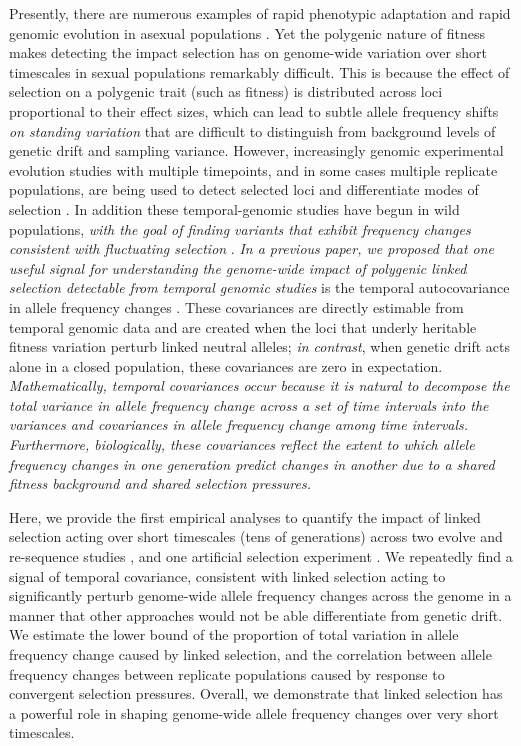 \documentclass[11pt]{article}
\newcommand{\vb}[1]{{\it \color{blue} #1}}
\begin{document}
Presently, there are numerous examples of rapid phenotypic adaptation
\parencite{Grant2011-wk,Grant2006-hj,Reznick1997-mh,Franks2007-dr} and rapid
genomic evolution in asexual populations
\parencite{Good2017-om,Bennett1990-bc,Baym2016-kh}.  Yet the polygenic nature
of fitness makes detecting the impact selection has on genome-wide variation
over short timescales in sexual populations remarkably difficult. This is
because the effect of selection on a polygenic trait (such as fitness) is
distributed across loci proportional to their effect sizes, which can lead to
subtle allele frequency shifts \vb{on standing variation} that are difficult to
distinguish from background levels of genetic drift and sampling variance.
However, increasingly genomic experimental evolution studies with multiple
timepoints, and in some cases multiple replicate populations, are being used to
detect selected loci \parencite{Turner2011-sx,Turner2012-bm} and differentiate
modes of selection \parencite{Burke2010-tz,Barghi2019-qy,Therkildsen2019-zy}.
In addition these temporal-genomic studies have begun in wild populations,
\vb{with the goal of finding variants that exhibit frequency changes consistent
with fluctuating selection} \parencite{Bergland2014-ij,Machado2018-cs}. \vb{In
a previous paper, we proposed that one useful signal for understanding the
genome-wide impact of polygenic linked selection detectable from temporal
genomic studies} is the temporal autocovariance in allele frequency changes
\parencite{Buffalo2019-io}.  These covariances are directly estimable from
temporal genomic data and are created when the loci that underly heritable
fitness variation perturb linked neutral alleles; \vb{in contrast}, when
genetic drift acts alone in a closed population, these covariances are zero in
expectation. \vb{Mathematically, temporal covariances occur because it is
  natural to decompose the total variance in allele frequency change across a
  set of time intervals into the variances and covariances in allele frequency
  change among time intervals.  Furthermore, biologically, these covariances
  reflect the extent to which allele frequency changes in one generation
predict changes in another due to a shared fitness background and shared
selection pressures.}

Here, we provide the first empirical analyses to quantify the impact of linked
selection acting over short timescales (tens of generations) across two evolve
and re-sequence studies \parencite{Barghi2019-qy,Kelly2019-dc}, and one
artificial selection experiment \parencite{Castro2019-uk}. We repeatedly find a
signal of temporal covariance, consistent with linked selection acting to
significantly perturb genome-wide allele frequency changes across the genome in
a manner that other approaches would not be able differentiate from genetic
drift. We estimate the lower bound of the proportion of total variation in
allele frequency change caused by linked selection, and the correlation between
allele frequency changes between replicate populations caused by response to
convergent selection pressures. Overall, we demonstrate that linked selection
has a powerful role in shaping genome-wide allele frequency changes over very
short timescales.
\end{document}
